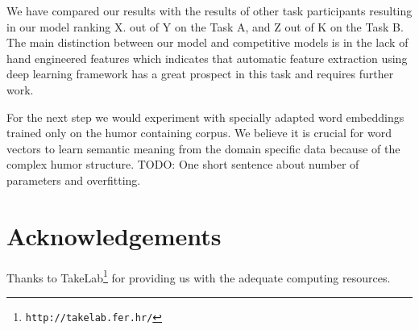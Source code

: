 \documentclass[10pt, a4paper]{article}
\begin{document}
We have compared our results with the results of other task participants resulting in our model ranking  X. out of Y on the Task A, and Z out of K on the Task B.  The main distinction between our model and competitive models is in the lack of hand engineered features which indicates that automatic feature extraction using deep learning framework has a great prospect in this task and requires further work.

For the next step we would experiment with specially adapted word embeddings trained only on the humor containing corpus. We believe it is crucial for word vectors to learn semantic meaning from the domain specific data because of the complex humor structure.  TODO: One short sentence about number of parameters and overfitting.

\section*{Acknowledgements}

Thanks to TakeLab\footnote{\texttt{http://takelab.fer.hr/}} for providing us with the adequate computing resources.


 
\end{document}

